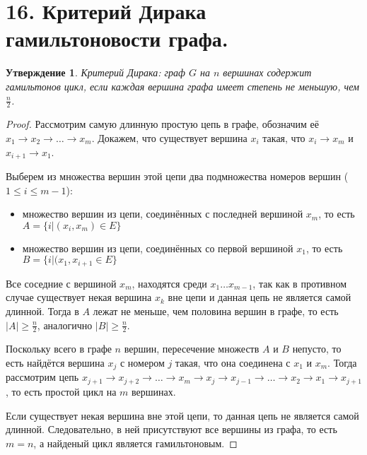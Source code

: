 \documentclass[a4paper,12pt]{article}
\newtheorem*{Statements}{Утверждение}
\begin{document}
    \section*{16. Критерий Дирака гамильтоновости графа.}
    \begin{Statements}
        Критерий Дирака: граф $G$ на $n$ вершинах содержит гамильтонов цикл,
        если каждая вершина графа имеет степень не меньшую, чем $\frac{n}{2}$.
    \end{Statements}
    \begin{proof}
        Рассмотрим самую длинную простую цепь в графе, обозначим её
        $x_1\rightarrow x_2\rightarrow\ldots\rightarrow x_m$. Докажем, что
        существует вершина $x_i$ такая, что $x_i\rightarrow x_m$ и $x_{i+1}
        \rightarrow x_1$.
        \par Выберем из множества вершин этой цепи два подмножества номеров
        вершин ($1\leq i \leq m-1$):
        \begin{itemize}
            \item множество вершин из цепи, соединённых с последней вершиной
                $x_m$, то есть $A=\{i|(x_i, x_m)\in E\}$
            \item множество вершин из цепи, соединённых со первой вершиной
                $x_1$, то есть $B=\{i|(x_1, x_{i+1}\in E\}$
        \end{itemize}
        Все соседние с вершиной $x_m$, находятся среди $x_1\ldots x_{m-1}$, так
        как в противном случае существует некая вершина $x_k$ вне цепи и данная
        цепь не является самой длинной. Тогда в $A$ лежат не меньше,
        чем половина вершин в графе, то есть $|A|\geq\frac{n}{2}$, аналогично
        $|B|\geq\frac{n}{2}$. \par
        Поскольку всего в графе $n$ вершин, пересечение множеств $A$ и $B$
        непусто, то есть найдётся  вершина $x_j$ с номером $j$ такая, что она
        соединена с $x_1$ и $x_m$. Тогда рассмотрим цепь $x_{j+1}\rightarrow
        x_{j+2}\rightarrow \ldots\rightarrow x_{m} \rightarrow x_j \rightarrow
        x_{j-1}\rightarrow \ldots \rightarrow x_2 \rightarrow x_1 \rightarrow
        x_{j+1}$, то есть простой цикл на $m$ вершинах.
        \par Если существует некая вершина вне этой цепи, то данная цепь не
        является самой длинной. Следовательно, в ней присутствуют все вершины
        из графа, то есть $m=n$, а найденый цикл является гамильтоновым.
    \end{proof}
\end{document}
